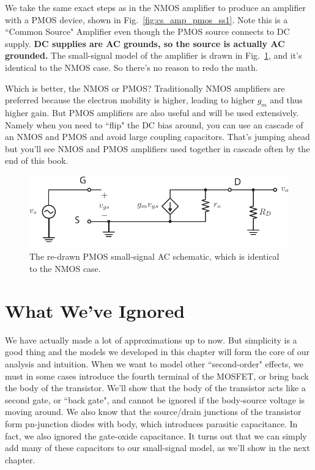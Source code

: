 We take the same exact steps as in the NMOS amplifier to produce an amplifier with a PMOS device, shown in Fig.~\ref{fig:cs_amp_pmos_ss1}.  Note this is a ``Common Source" Amplifier even though the PMOS source connects to DC supply.  \textbf{DC supplies are AC grounds, so the source is actually AC grounded.}   The small-signal model of the amplifier is drawn in Fig.~\ref{fig:csamp_pmos_ss}, and it's identical to the NMOS case.  So there's no reason to redo the math.

Which is better, the NMOS or PMOS?  Traditionally NMOS amplifiers are preferred because the electron mobility is higher, leading to higher $g_m$ and thus higher gain.  But PMOS amplifiers are also useful and will be used extensively.  Namely when you need to ``flip" the DC bias around, you can use an cascade of an NMOS and PMOS and avoid large coupling capacitors.  That's jumping ahead but you'll see NMOS and PMOS amplifiers used together in cascade often by the end of this book.  




\begin{figure}[tb]
\begin{center}
\includegraphics[scale=1]{csamp_pmos_ss}
\end{center}
\caption{The re-drawn PMOS small-signal AC schematic, which is identical to the NMOS case.} \label{fig:csamp_pmos_ss}
\end{figure}





\section{What We've Ignored}

We have actually made a lot of approximations up to now.  But simplicity is a good thing and the models we developed in this chapter will form the core of our analysis and intuition.  When we want to model other ``second-order" effects, we must in some cases introduce the fourth terminal of the MOSFET, or bring back the body of the transistor.  We'll show that the body of the transistor acts like a second gate, or ``back gate", and cannot be ignored if the body-source voltage is moving around.  We also know that the source/drain junctions of the transistor form pn-junction diodes with body, which  introduces parasitic capacitance.  In fact, we also ignored the gate-oxide capacitance. It turns out that we can simply add many of these capacitors to our small-signal model, as we'll show in the next chapter.

